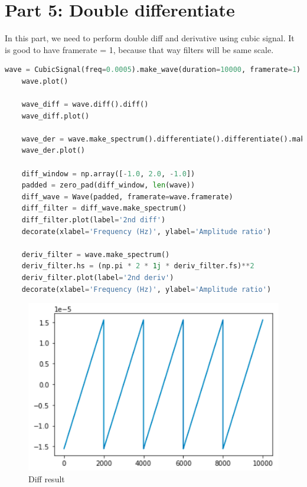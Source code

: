\documentclass[a4paper]{article}
\begin{document}
    \newpage
        \section{Part 5: Double differentiate}
        
        In this part, we need to perform double diff and derivative using cubic signal. It is good to have framerate = 1, because that way filters will be same scale.
            
        \begin{lstlisting}[language=Python,caption=Double diff,label={lst:part1_2}]
    wave = CubicSignal(freq=0.0005).make_wave(duration=10000, framerate=1)
    wave.plot()
    
    wave_diff = wave.diff().diff()
    wave_diff.plot()
    
    wave_der = wave.make_spectrum().differentiate().differentiate().make_wave()
    wave_der.plot()
    
    diff_window = np.array([-1.0, 2.0, -1.0])
    padded = zero_pad(diff_window, len(wave))
    diff_wave = Wave(padded, framerate=wave.framerate)
    diff_filter = diff_wave.make_spectrum()
    diff_filter.plot(label='2nd diff')
    decorate(xlabel='Frequency (Hz)', ylabel='Amplitude ratio')
    
    deriv_filter = wave.make_spectrum()
    deriv_filter.hs = (np.pi * 2 * 1j * deriv_filter.fs)**2
    deriv_filter.plot(label='2nd deriv')
    decorate(xlabel='Frequency (Hz)', ylabel='Amplitude ratio')
        \end{lstlisting}
        
        \begin{figure}[H]
            \centering
            \includegraphics[width=\textwidth]{img/p5_1.png}
            \caption{Diff result}
            \label{fig:part1_1_2}
        \end{figure}
        
\end{document}
